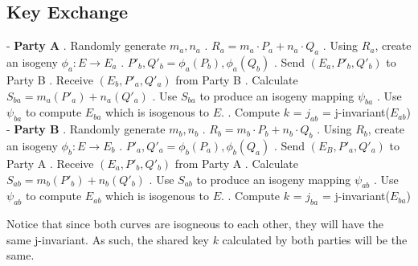 \documentclass[10pt,twocolumn]{article} %
\begin{document}
\subsection{Key Exchange}

- \textbf{Party A} 
. Randomly generate $ m_{a},n_{a}$
. $R_{a} = m_{a}\cdot P_{a}+n_{a}\cdot Q_{a}$
. Using $R_{a}$, create an isogeny $\phi_{a}: E \rightarrow E_{a}$
. $P'_{b},Q'_{b}=\phi_{a}(P_{b}),\phi_{a}(Q_{b})$
. Send $(E_{a}, P'_{b}, Q'_{b})$ to Party B
. Receive $(E_b, P'_a, Q'_a)$ from Party B
. Calculate $S_{ba} = m_a(P'_a)+n_a(Q'_a)$ 
. Use $S_{ba}$ to produce an isogeny mapping $\psi_{ba}$
. Use $\psi_{ba}$ to compute $E_{ba}$ which is isogenous to $E$.
. Compute $k$ = $j_{ab}$ = j-invariant($E_{ab}$)
\newline
\newline
- \textbf{Party B}
. Randomly generate $ m_{b},n_{b}$
. $R_{b} = m_{b}\cdot P_{b}+n_{b}\cdot Q_{b}$
. Using $R_{b}$, create an isogeny $\phi_{b}: E \rightarrow E_{b}$
. $P'_{a},Q'_{a}=\phi_{b}(P_{a}),\phi_{b}(Q_{a})$
. Send $(E_B, P'_{a}, Q'_{a})$ to Party A
. Receive $(E_a, P'_b, Q'_b)$ from Party A
. Calculate $S_{ab} = m_b(P'_b)+n_b(Q'_b)$ 
. Use $S_{ab}$ to produce an isogeny mapping $\psi_{ab}$
. Use $\psi_{ab}$ to compute $E_{ab}$ which is isogenous to $E$.
. Compute $k$ = $j_{ba}$ = j-invariant($E_{ba}$)
\newline


\par Notice that since both curves are isogneous to each other, they will have the same j-invariant. As such, the shared key $k$ calculated by both parties will be the same.
\end{document}
